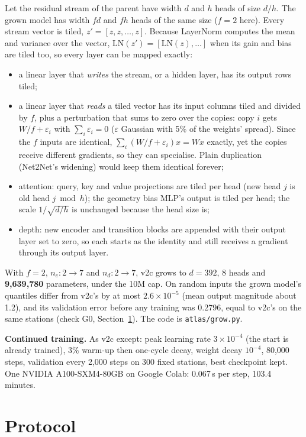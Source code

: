 \documentclass{article}
\begin{document}
Let the residual stream of the parent have width $d$ and $h$ heads of size $d/h$. The grown model has width $fd$ and
$fh$ heads of the same size ($f=2$ here). Every stream vector is tiled, $z' = [z, z, \ldots, z]$. Because LayerNorm
\citep{ba2016layernorm} computes the mean and variance over the vector, $\mathrm{LN}(z') = [\mathrm{LN}(z),\ldots]$ when
its gain and bias are tiled too, so every layer can be mapped exactly:
\begin{itemize}
\item a linear layer that \emph{writes} the stream, or a hidden layer, has its output rows tiled;
\item a linear layer that \emph{reads} a tiled vector has its input columns tiled and divided by $f$, plus a
perturbation that sums to zero over the copies: copy $i$ gets $W/f + \varepsilon_i$ with $\sum_i \varepsilon_i = 0$
($\varepsilon$ Gaussian with 5\% of the weights' spread). Since the $f$ inputs are identical,
$\sum_i (W/f+\varepsilon_i)x = Wx$ exactly, yet the copies receive different gradients, so they can specialise. Plain
duplication (Net2Net's widening) would keep them identical forever;
\item attention: query, key and value projections are tiled per head (new head $j$ is old head $j \bmod h$); the
geometry bias MLP's output is tiled per head; the scale $1/\sqrt{d/h}$ is unchanged because the head size is;
\item depth: new encoder and transition blocks are appended with their output layer set to zero, so each starts as the
identity and still receives a gradient through its output layer.
\end{itemize}
With $f=2$, $n_e: 2\to7$ and $n_d: 2\to7$, v2c grows to $d=392$, 8 heads and \textbf{9,639,780} parameters, under the
10M cap. On random inputs the grown model's quantiles differ from v2c's by at most $2.6\times10^{-5}$ (mean output
magnitude about 1.2), and its validation error before any training was 0.2796, equal to v2c's on the same stations
(check G0, Section~\ref{sec:protocol}). The code is \texttt{atlas/grow.py}.

\textbf{Continued training.} As v2c except: peak learning rate $3\times10^{-4}$ (the start is already trained), 3\%
warm-up then one-cycle decay, weight decay $10^{-4}$, 80,000 steps, validation every 2,000 steps on 300 fixed stations,
best checkpoint kept. One NVIDIA A100-SXM4-80GB on Google Colab: 0.067\,s per step, 103.4 minutes.

\section{Protocol}
\label{sec:protocol}
\end{document}
